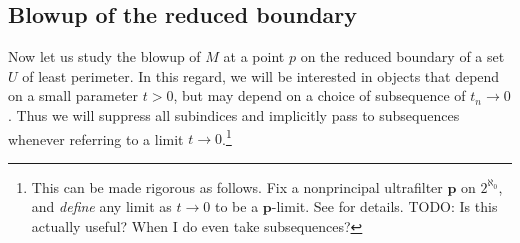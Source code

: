 \documentclass[reqno,12pt,letterpaper]{amsart}
\theoremstyle{definition}
\numberwithin{equation}{section}
\begin{document}
\subsection{Blowup of the reduced boundary}
Now let us study the blowup of $M$ at a point $p$ on the reduced boundary of a set $U$ of least perimeter.
In this regard, we will be interested in objects that depend on a small parameter $t > 0$, but may depend on a choice of subsequence of $t_n \to 0$.
Thus we will suppress all subindices and implicitly pass to subsequences whenever referring to a limit $t \to 0$.\footnote{This can be made rigorous as follows. Fix a nonprincipal ultrafilter $\mathbf p$ on $2^{\aleph_0}$, and \emph{define} any limit as $t \to 0$ to be a $\mathbf p$-limit. See \cite{Tao07} for details. TODO: Is this actually useful? When I do even take subsequences?}
\end{document}
